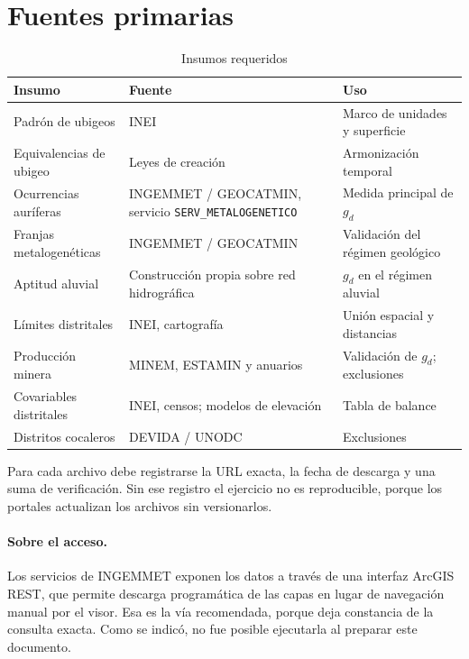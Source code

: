 \documentclass[11pt,a4paper]{article}
\begin{document}
\section{Fuentes primarias}

\begin{table}[h!]
\centering
\singlespacing
\caption{Insumos requeridos}
\label{tab:fuentes}
\small
\begin{tabularx}{\textwidth}{L{3.7cm} L{3.5cm} X}
\toprule
\textbf{Insumo} & \textbf{Fuente} & \textbf{Uso} \\
\midrule
Padrón de ubigeos & INEI & Marco de unidades y superficie \\
Equivalencias de ubigeo & Leyes de creación & Armonización temporal \\
Ocurrencias auríferas & INGEMMET / GEOCATMIN, servicio \texttt{SERV\_METALOGENETICO} & Medida principal de $g_d$ \\
Franjas metalogenéticas & INGEMMET / GEOCATMIN & Validación del régimen geológico \\
Aptitud aluvial & Construcción propia sobre red hidrográfica & $g_d$ en el régimen aluvial \\
Límites distritales & INEI, cartografía & Unión espacial y distancias \\
Producción minera & MINEM, ESTAMIN y anuarios & Validación de $g_d$; exclusiones \\
Covariables distritales & INEI, censos; modelos de elevación & Tabla de balance \\
Distritos cocaleros & DEVIDA / UNODC & Exclusiones \\
\bottomrule
\end{tabularx}
\end{table}

Para cada archivo debe registrarse la URL exacta, la fecha de descarga y una suma de verificación. Sin ese registro el ejercicio no es reproducible, porque los portales actualizan los archivos sin versionarlos.

\paragraph{Sobre el acceso.} Los servicios de INGEMMET exponen los datos a través de una interfaz ArcGIS REST, que permite descarga programática de las capas en lugar de navegación manual por el visor. Esa es la vía recomendada, porque deja constancia de la consulta exacta. Como se indicó, no fue posible ejecutarla al preparar este documento.
\end{document}
